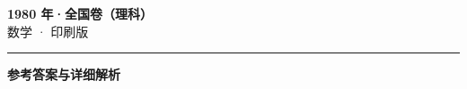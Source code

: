 \documentclass[zihao=5, a4paper]{ctexart}
\begin{document}
\begin{center}
  {\Large\bfseries 1980 年·全国卷（理科）}\\[4pt]
  {\large 数学 · 印刷版}
\end{center}
\medskip
{}

\par\bigskip\hrule\bigskip
{}
\begin{center}{\large\bfseries 参考答案与详细解析}\end{center}
\smallskip

\end{document}
